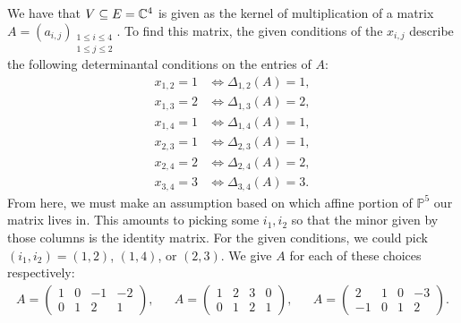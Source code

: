 \documentclass[letterpaper, 11pt, oneside]{book}
\begin{document}
\begin{sol}\label{ex:YT_9.1.2}
  We have that $V \subseteq E = \mathbb{C}^{4}$ is given as the kernel of multiplication of a matrix $A = (a_{i, j})_{\substack{1 \leq i \leq 4 \\ 1 \leq j \leq 2}}$.
  To find this matrix, the given conditions of the $x_{i, j}$ describe the following determinantal conditions on the entries of $A$:
  \begin{align*}
    x_{1, 2} = 1 &\iff \Delta_{1, 2}(A) = 1, \\
    x_{1, 3} = 2 &\iff \Delta_{1, 3}(A) = 2, \\
    x_{1, 4} = 1 &\iff \Delta_{1, 4}(A) = 1, \\
    x_{2, 3} = 1 &\iff \Delta_{2, 3}(A) = 1, \\
    x_{2, 4} = 2 &\iff \Delta_{2, 4}(A) = 2, \\
    x_{3, 4} = 3 &\iff \Delta_{3, 4}(A) = 3.
  \end{align*}
  From here, we must make an assumption based on which affine portion of $\mathbb{P}^{5}$ our matrix lives in.
  This amounts to picking some $i_{1}, i_{2}$ so that the minor given by those columns is the identity matrix.
  For the given conditions, we could pick $(i_{1}, i_{2}) = (1, 2)$, $(1, 4)$, or $(2, 3)$.
  We give $A$ for each of these choices respectively:
  \begin{align*}
    A =
    \begin{pmatrix}
      1 & 0 & -1 & -2 \\
      0 & 1 & 2 & 1
    \end{pmatrix},
    &&
    A =
    \begin{pmatrix}
      1 & 2 & 3 & 0 \\
      0 & 1 & 2 & 1
    \end{pmatrix},
    &&
    A =
    \begin{pmatrix}
      2 & 1 & 0 & -3 \\
      -1 & 0 & 1 & 2
    \end{pmatrix}.
  \end{align*}
\end{sol}

\printbibliography
\end{document}
